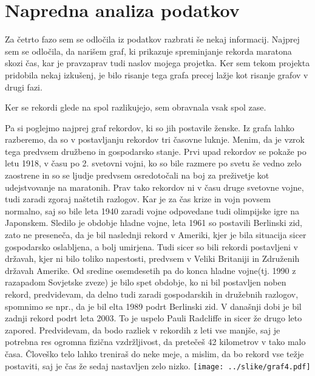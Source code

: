 \documentclass[11pt,a4paper]{article}
\begin{document}


\section{Napredna analiza podatkov}

Za četrto fazo sem se odločila iz podatkov razbrati še nekaj informacij. Najprej sem se odločila, da narišem graf, ki prikazuje spreminjanje rekorda maratona skozi čas, kar je pravzaprav tudi naslov mojega projetka. Ker sem tekom projekta pridobila nekaj izkušenj, je bilo risanje tega grafa precej lažje kot risanje grafov v drugi fazi.

Ker se rekordi glede na spol razlikujejo, sem obravnala vsak spol zase.

Pa si poglejmo najprej graf rekordov, ki so jih postavile ženske.
Iz grafa lahko razberemo, da so v postavljanju rekordov tri časovne luknje. Menim, da je vzrok tega predvsem družbeno in gospodarsko stanje. Prvi upad rekordov se pokaže po letu 1918, v času po 2. svetovni vojni, ko so bile razmere po svetu še vedno zelo zaostrene in so se ljudje predvsem osredotočali na boj za preživetje kot udejstvovanje na maratonih.
Prav tako rekordov ni v času druge svetovne vojne, tudi zaradi zgoraj naštetih razlogov. Kar je za čas krize in vojn povsem normalno, saj so bile leta 1940 zaradi vojne odpovedane tudi olimpijske igre na Japonskem.
Sledilo je obdobje hladne vojne, leta 1961 so postavili Berlinski zid, zato ne preseneča, da je bil naslednji rekord v Ameriki, kjer je bila situacija sicer gospodarsko oslabljena, a bolj umirjena. Tudi sicer so bili rekordi postavljeni v državah, kjer ni bilo toliko napestosti, predvsem v Veliki Britaniji in Združenih državah Amerike.
Od sredine osemdesetih pa do konca hladne vojne(tj. 1990 z razapadom Sovjetske zveze) je bilo spet obdobje, ko ni bil postavljen noben rekord, predvidevam, da delno tudi zaradi gospodarskih in družebnih razlogov, spomnimo se npr., da je bil elta 1989 podrt Berlinski zid.
V današnji dobi je bil zadnji rekord podrt leta 2003. To je uspelo Pauli Radcliffe in sicer že drugo leto zapored.
Predvidevam, da bodo razliek v rekordih z leti vse manjše, saj je potrebna res ogromna fizična vzdržljivost, da  pretečeš 42 kilometrov v tako malo časa. Človeško telo lahko treniraš do neke meje, a mislim, da bo rekord vse težje postaviti, saj je čas že sedaj nastavljen zelo nizko.
\texttt{[image: ../slike/graf4.pdf]}
\end{document}
